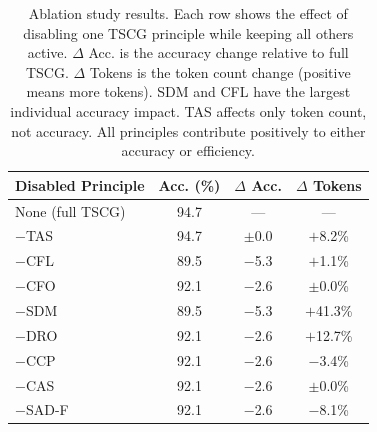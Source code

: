 \begin{table}[t]
\centering
\small
\begin{tabular}{@{}l c c c@{}}
\toprule
\textbf{Disabled Principle} & \textbf{Acc. (\%)} & \textbf{$\Delta$ Acc.} & \textbf{$\Delta$ Tokens} \\
\midrule
None (full TSCG)     & 94.7 & ---       & --- \\
\midrule
$-$TAS               & 94.7 & $\pm$0.0  & $+$8.2\% \\
$-$CFL               & 89.5 & $-$5.3    & $+$1.1\% \\
$-$CFO               & 92.1 & $-$2.6    & $\pm$0.0\% \\
$-$SDM               & 89.5 & $-$5.3    & $+$41.3\% \\
$-$DRO               & 92.1 & $-$2.6    & $+$12.7\% \\
$-$CCP               & 92.1 & $-$2.6    & $-$3.4\% \\
$-$CAS               & 92.1 & $-$2.6    & $\pm$0.0\% \\
$-$SAD-F             & 92.1 & $-$2.6    & $-$8.1\% \\
\bottomrule
\end{tabular}
\caption{Ablation study results. Each row shows the effect of disabling one TSCG principle while keeping all others active. $\Delta$ Acc. is the accuracy change relative to full TSCG. $\Delta$ Tokens is the token count change (positive means more tokens). SDM and CFL have the largest individual accuracy impact. TAS affects only token count, not accuracy. All principles contribute positively to either accuracy or efficiency.}
\label{tab:ablation}
\end{table}
